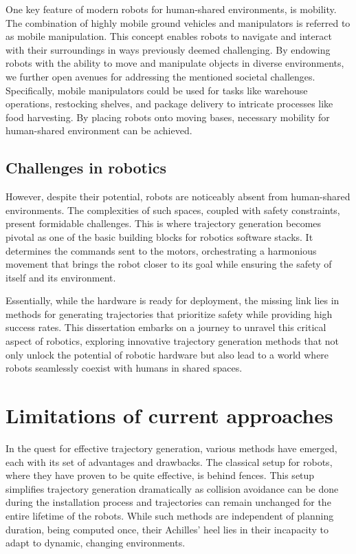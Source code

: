 One key feature of modern robots for human-shared
environments, is mobility. The combination of highly mobile
ground vehicles and manipulators is referred to as mobile
manipulation. This concept enables robots to navigate and
interact with their surroundings in ways previously deemed
challenging. By endowing robots with the ability to move and
manipulate objects in diverse environments, we further open
avenues for addressing the mentioned societal challenges.
Specifically, mobile manipulators could be used for tasks
like warehouse operations, restocking shelves, and package
delivery to intricate processes like food harvesting.
By placing robots onto moving bases, necessary mobility for
human-shared environment can be achieved.

\subsection{Challenges in robotics}

However, despite their potential, robots are noticeably absent from human-shared
environments. The complexities of such spaces, coupled with safety constraints,
present formidable challenges. This is where trajectory generation becomes
pivotal as one of the basic building blocks for robotics
software stacks.
It determines the commands sent to the motors, orchestrating a harmonious
movement that brings the robot closer to its goal while
ensuring the safety of itself and its environment.

Essentially, while the hardware is ready for deployment, the missing link lies
in methods for generating trajectories that prioritize
safety while providing high success rates. This dissertation
embarks on a journey to unravel this critical aspect of robotics, exploring
innovative trajectory generation methods that not only unlock the potential of
robotic hardware but also lead to a world where robots seamlessly coexist with
humans in shared spaces.

\section{Limitations of current approaches}

In the quest for effective trajectory generation, various
methods have emerged, each with its set of advantages and
drawbacks. The classical setup for robots, where they have
proven to be quite effective, is behind fences. This setup
simplifies trajectory generation dramatically as collision
avoidance can be done during the installation process and
trajectories can remain unchanged for the entire lifetime of
the robots. While such methods are independent of planning
duration, being computed once, their Achilles' heel lies in
their incapacity to adapt to dynamic, changing environments.

